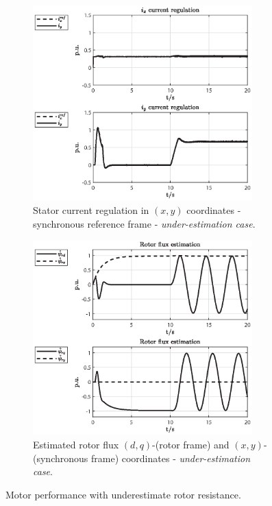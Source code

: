 \documentclass[11pt,a4paper,oneside]{book}
\numberwithin{equation}{section}
\theoremstyle{it}
\theoremstyle{definition}
\begin{document}
\begin{figure}[H]
	\centering
	\begin{subfigure}{0.5\textwidth}
	\centering
	\includegraphics[width = 240pt, keepaspectratio]{figures/under_est/current_reg.eps}
	\captionsetup{width=0.65\textwidth, font=footnotesize}		
	\caption{Stator current regulation in $(x,y)$ coordinates - synchronous reference frame - \textit{under-estimation case}.}
	\label{fig_sim_res_5}
	\end{subfigure}%
	\begin{subfigure}{0.5\textwidth}
	\centering
	\includegraphics[width = 240pt, keepaspectratio]{figures/under_est/rotor_flux_est_1.eps}
	\captionsetup{width=0.65\textwidth, font=footnotesize}		
	\caption{Estimated rotor flux $(d,q)$-(rotor frame) and $(x,y)$-(synchronous frame) coordinates - \textit{under-estimation case}.}
	\label{fig_sim_res_6}
	\end{subfigure}		
	\captionsetup{width=0.5\textwidth, font=small}		
	\caption{Motor performance with underestimate rotor resistance.}
	\label{}
\end{figure}
\end{document}
